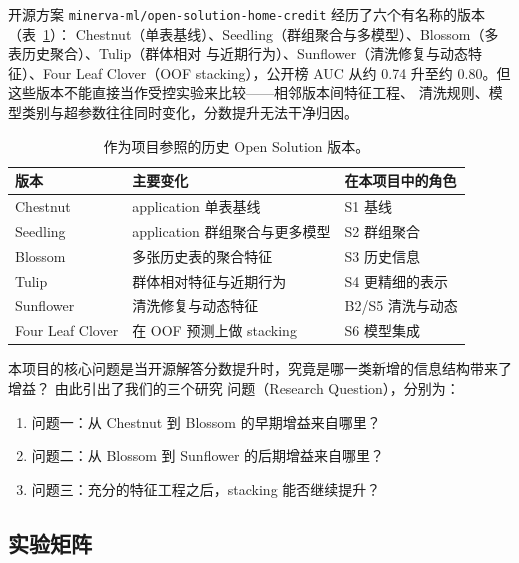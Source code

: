 \documentclass[12pt,UTF8,fontset=windows]{ctexart}
\begin{document}
开源方案 \texttt{minerva-ml/open-solution-home-credit} 经历了六个有名称的版本（表~\ref{tab:versions}）：
Chestnut（单表基线）、Seedling（群组聚合与多模型）、Blossom（多表历史聚合）、Tulip（群体相对
与近期行为）、Sunflower（清洗修复与动态特征）、Four Leaf Clover（OOF stacking），公开榜 AUC
从约 0.74 升至约 0.80。但这些版本不能直接当作受控实验来比较——相邻版本间特征工程、
清洗规则、模型类别与超参数往往同时变化，分数提升无法干净归因。

\begin{table}[h]
\centering\small
\caption{作为项目参照的历史 Open Solution 版本。}\label{tab:versions}
\begin{tabular}{p{}p{}p{}}
\toprule
版本 & 主要变化 & 在本项目中的角色 \\
\midrule
Chestnut & application 单表基线 & S1 基线 \\
Seedling & application 群组聚合与更多模型 & S2 群组聚合 \\
Blossom & 多张历史表的聚合特征 & S3 历史信息 \\
Tulip & 群体相对特征与近期行为 & S4 更精细的表示 \\
Sunflower & 清洗修复与动态特征 & B2/S5 清洗与动态 \\
Four Leaf Clover & 在 OOF 预测上做 stacking & S6 模型集成 \\
\bottomrule
\end{tabular}
\end{table}

本项目的核心问题是当开源解答分数提升时，究竟是哪一类新增的信息结构带来了增益？ 由此引出了我们的三个研究
问题（Research Question），分别为：

\begin{enumerate}
\item 问题一：从 Chestnut 到 Blossom 的早期增益来自哪里？
\item 问题二：从 Blossom 到 Sunflower 的后期增益来自哪里？
\item 问题三：充分的特征工程之后，stacking 能否继续提升？
\end{enumerate}

\subsection{实验矩阵}
\end{document}

